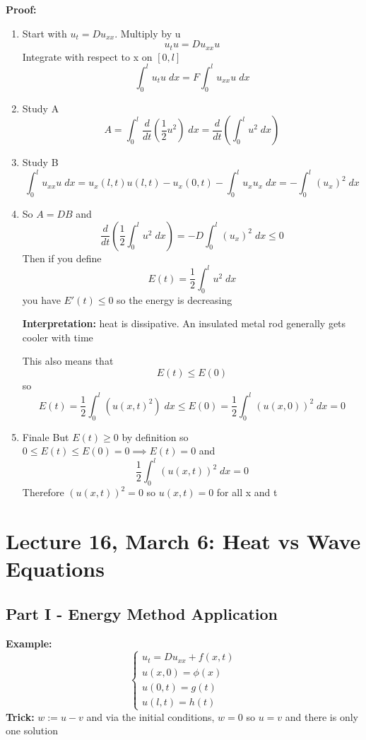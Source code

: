 \documentclass[12pt]{article}
\begin{document}
\textbf{Proof:}
\begin{enumerate}
    \item Start with $u_t = Du_{xx}$. Multiply by u 
    \[u_t u = Du_{xx}u\] 
    Integrate with respect to x on $[0, l]$
    \[\int_0^l u_t u \; dx = F \int_0^l u_{xx}u\; dx\]
    \item Study A 
    \[A = \int_0^l \frac{d}{dt}\left(\frac{1}{2}u^2\right) \; dx = \frac{d}{dt} \left(\int_0^l u^2 \; dx\right)\]
    \item Study B
    \[\int_0^l u_{xx} u\; dx = u_x(l, t)u(l, t) - u_x(0, t) - \int_0^l u_x u_x \; dx = -\int_0^l (u_x)^2\;dx\]

    \item So $A = DB$ and 
    \[\frac{d}{dt}\left(\frac{1}{2}\int_0^l u^2 \; dx\right) = -D\int_0^l (u_x)^2 \; dx \leq 0\]
    Then if you define 
    \[E(t) = \frac{1}{2}\int_0^l u^2 \; dx\]
    you have $E'(t) \leq 0$ so the energy is decreasing 

    \textbf{Interpretation:} heat is dissipative. An insulated metal rod generally gets cooler with time

    This also means that 
    \[E(t) \leq E(0)\]
    so 
    \[E(t) = \frac{1}{2}\int_0^l (u(x, t)^2)\; dx \leq E(0) = \frac{1}{2}\int_0^l (u(x, 0))^2\; dx = 0\]

    \item Finale
    But $E(t) \geq 0$ by definition so $0 \leq E(t) \leq E(0) = 0 \implies E(t) = 0$ and 
    \[\frac{1}{2}\int_0^l (u(x, t))^2\; dx = 0\]
    Therefore $(u(x, t))^2 =0$ so $u(x, t) = 0$ for all x and t
\end{enumerate}

\section{Lecture 16, March 6: Heat vs Wave Equations}
\subsection*{Part I - Energy Method Application}
\textbf{Example:}
\[\begin{cases}
    u_t = Du_{xx} + f(x, t)\\
    u(x, 0) = \phi(x)\\
    u(0, t) = g(t)\\
    u(l, t) = h(t)
\end{cases}\]
\textbf{Trick:} $w := u - v$ and via the initial conditions, $w = 0$ so $u = v$ and there is only one solution
\end{document}
